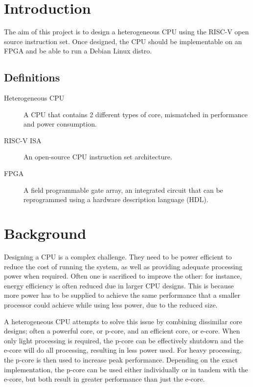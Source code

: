 \documentclass[a4paper,fleqn,12pt]{article}
\begin{document}


\pagestyle{plain}

\section{Introduction}
The aim of this project is to design a heterogeneous CPU using the RISC-V open source instruction set. Once designed, the CPU should be implementable on an FPGA and be able to run a Debian Linux distro. 

\subsection{Definitions}
\begin{description}
    \item[Heterogeneous CPU] A CPU that contains 2 different types of core, mismatched in performance and power consumption.
    \item[RISC-V ISA] An open-source CPU instruction set architecture.
    \item[FPGA] A field programmable gate array, an integrated circuit that can be reprogrammed using a hardware description language (HDL).
\end{description}

\section{Background}
Designing a CPU is a complex challenge. They need to be power efficient to reduce the cost of running the system, as well as providing adequate processing power when required. Often one is sacrificed to improve the other: for instance, energy efficiency is often reduced due in larger CPU designs. This is because more power has to be supplied to achieve the same performance that a smaller processor could achieve while using less power, due to the reduced size.

A heterogeneous CPU attempts to solve this issue by combining dissimilar core designs; often a powerful core, or p-core, and an efficient core, or e-core. When only light processing is required, the p-core can be effectively shutdown and the e-core will do all processing, resulting in less power used. For heavy processing, the p-core is then used to increase peak performance. Depending on the exact implementation, the p-core can be used either individually or in tandem with the e-core, but both result in greater performance than just the e-core.
\end{document}

